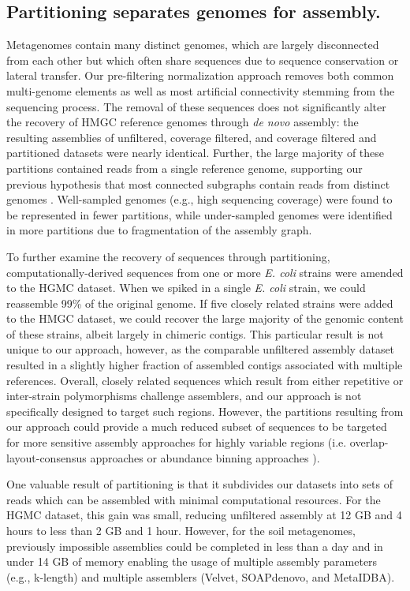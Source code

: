 \documentclass{pnastwo}
\begin{document}
\begin{article}
\subsection*{Partitioning separates genomes for assembly.}
Metagenomes contain many distinct genomes, which are largely disconnected from
each other but which often share sequences due to sequence conservation or
lateral transfer. Our pre-filtering normalization approach removes both common multi-genome
elements as well as most artificial connectivity stemming from the sequencing
process. The removal of these sequences does not significantly alter the
recovery of HMGC reference genomes through {\em de novo} assembly: the resulting
assemblies of unfiltered, coverage filtered, and coverage filtered and
partitioned datasets were nearly identical. Further, the large majority of these
partitions contained reads from a single reference genome, supporting our
previous hypothesis that most connected subgraphs contain reads from distinct
genomes \cite{Pell:2012cq}. Well-sampled genomes (e.g., high sequencing coverage) were found to
be represented in fewer partitions, while under-sampled genomes
were identified in more partitions due to fragmentation of the assembly graph.

To further examine the recovery of sequences through partitioning,
computationally-derived sequences from one or more \emph{E. coli} strains were
amended to the HGMC dataset. When we spiked in a single \emph{E. coli} strain,
we could reassemble 99\% of the original genome. If five closely related strains
were added to the HMGC dataset, we could recover the large majority of the
genomic content of these strains, albeit largely in chimeric contigs. This particular
result is not unique to our approach, however, as the comparable unfiltered assembly 
dataset resulted in a slightly higher fraction of assembled contigs associated
with multiple references. Overall, closely related sequences which result from
either repetitive or inter-strain polymorphisms challenge assemblers, and our
approach is not specifically designed to target such regions. However, the
partitions resulting from our approach could provide a much reduced subset of
sequences to be targeted for more sensitive assembly approaches for highly
variable regions (i.e. overlap-layout-consensus approaches or abundance binning
approaches \cite{Sharon:2012kx}).

One valuable result of partitioning is that it subdivides our datasets into sets
of reads which can be assembled with minimal computational resources. For the
HGMC dataset, this gain was small, reducing unfiltered assembly at 12 GB and 4
hours to less than 2 GB and 1 hour. However, for the soil metagenomes,
previously impossible assemblies could be completed in less than a day and in
under 14 GB of memory enabling the usage of multiple assembly parameters (e.g.,
k-length) and multiple assemblers (Velvet, SOAPdenovo, and MetaIDBA).


\end{article}
\end{document}
